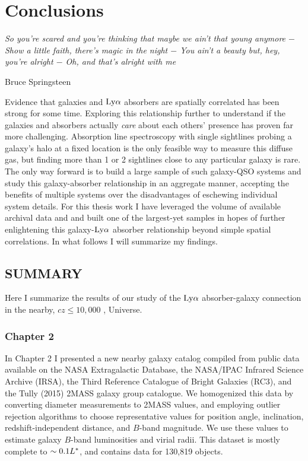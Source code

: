 \chapter[Conclusions]{Conclusions}
\label{chap:conclusions}

\vspace*{\fill}


\epigraph{\fixspacing\emph{So you're scared and you're thinking that maybe we ain't that young anymore $-$
Show a little faith, there's magic in the night $-$
You ain't a beauty but, hey, you're alright $-$
Oh, and that's alright with me}}{Bruce Springsteen}


\clearpage

Evidence that galaxies and $\rm Ly\alpha$ absorbers are spatially correlated has been strong for some time. Exploring this relationship further to understand if the galaxies and absorbers actually \emph{care} about each others' presence has proven far more challenging. Absorption line spectroscopy with single sightlines probing a galaxy's halo at a fixed location is the only feasible way to measure this diffuse gas, but finding more than 1 or 2 sightlines close to any particular galaxy is rare. The only way forward is to build a large sample of such galaxy-QSO systems and study this galaxy-absorber relationship in an aggregate manner, accepting the benefits of multiple systems over the disadvantages of eschewing individual system details. For this thesis work I have leveraged the volume of available archival data and and built one of the largest-yet samples in hopes of further enlightening this galaxy-$\rm Ly\alpha$ absorber relationship beyond simple spatial correlations. In what follows I will summarize my findings.

\section{SUMMARY}
Here I summarize the results of our study of the $\rm Ly\alpha$ absorber-galaxy connection in the nearby, $cz \leq 10,000$ \kms, Universe.

\subsection{Chapter 2}
In Chapter 2 I presented a new nearby galaxy catalog compiled from public data available on the NASA Extragalactic Database, the NASA/IPAC Infrared Science Archive (IRSA), the Third Reference Catalogue of Bright Galaxies (RC3), and the Tully (2015) 2MASS galaxy group catalogue. We homogenized this data by converting diameter measurements to 2MASS values, and employing outlier rejection algorithms to choose representative values for position angle, inclination, redshift-independent distance, and $B$-band magnitude. We use these values to estimate galaxy $B$-band luminosities and virial radii. This dataset is mostly complete to $\sim 0.1 L^{\**}$, and contains data for 130,819 objects.


